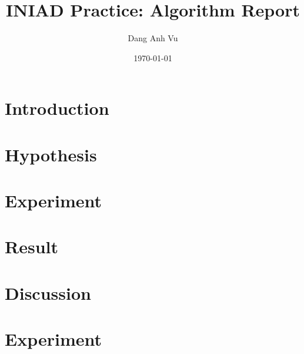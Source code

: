 \documentclass{jsarticle}
\title{INIAD Practice: Algorithm Report}
\author{Dang Anh Vu}
\date{\today}
\begin{document}
\maketitle
\section{Introduction}

\maketitle
\section{Hypothesis}

\maketitle
\section{Experiment}

\maketitle
\section{Result}

\maketitle
\section{Discussion}

\maketitle
\section{Experiment}
\end{document}

